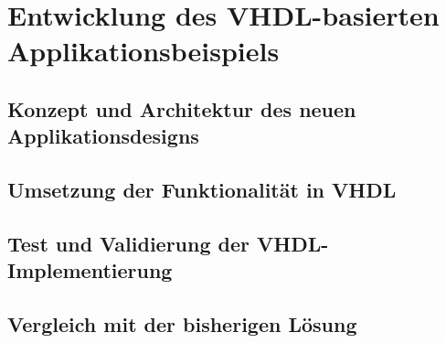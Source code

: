\chapter{Entwicklung des VHDL-basierten Applikationsbeispiels}

\section{Konzept und Architektur des neuen Applikationsdesigns}
\section{Umsetzung der Funktionalität in VHDL}
\section{Test und Validierung der VHDL-Implementierung}
\section{Vergleich mit der bisherigen Lösung}